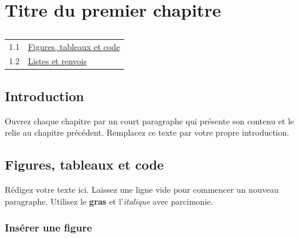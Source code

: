 \chapter{Titre du premier chapitre}

\section*{\outlinename}
\begin{center}
\begin{tabular}{cl}
  1.1 & \hyperref[sec:ch1-elements]{Figures, tableaux et code} \\
  1.2 & \hyperref[sec:ch1-lists]{Listes et renvois} \\
\end{tabular}
\end{center}

\section*{Introduction}

Ouvrez chaque chapitre par un court paragraphe qui présente son contenu et
le relie au chapitre précédent. Remplacez ce texte par votre propre
introduction.

\vfill
\newpage

\section{Figures, tableaux et code}\label{sec:ch1-elements}

Rédigez votre texte ici. Laissez une ligne vide pour commencer un nouveau
paragraphe. Utilisez le \textbf{gras} et l'\textit{italique} avec parcimonie.

\subsection{Insérer une figure}

